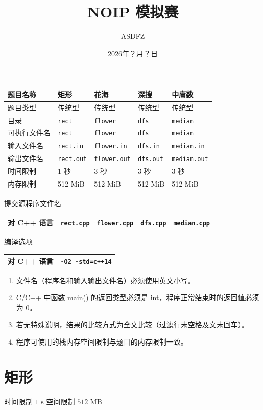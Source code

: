 \documentclass[12pt,a4paper,oneside]{ctexart}
\begin{document}
\title{\heiti{} NOIP 模拟赛}\author{ASDFZ}\date{2026年？月？日}\maketitle
\begin{center}\small
\begin{tabularx}{\textwidth}{|Y|Y|Y|Y|Y|}\hline
题目名称 & 矩形 & 花海 & 深搜 & 中庸数\\\hline
题目类型 & 传统型 & 传统型 & 传统型 & 传统型\\\hline
目录 & \texttt{rect} & \texttt{flower} & \texttt{dfs} & \texttt{median}\\\hline
可执行文件名 & \texttt{rect} & \texttt{flower} & \texttt{dfs} & \texttt{median}\\\hline
输入文件名 & \texttt{rect.in} & \texttt{flower.in} & \texttt{dfs.in} & \texttt{median.in}\\\hline
输出文件名 & \texttt{rect.out} & \texttt{flower.out} & \texttt{dfs.out} & \texttt{median.out}\\\hline
时间限制 & 1 秒 & 3 秒 & 3 秒 & 3 秒\\\hline
内存限制 & 512 MiB & 512 MiB & 512 MiB & 512 MiB\\\hline
\end{tabularx}\end{center}
\hspace{2em}提交源程序文件名
\begin{center}\small\begin{tabularx}{\textwidth}{|p{100pt}|Y|Y|Y|Y|}\hline
对 C++ 语言 & \texttt{rect.cpp} & \texttt{flower.cpp} & \texttt{dfs.cpp} & \texttt{median.cpp}\\\hline
\end{tabularx}\end{center}
\hspace{2em}编译选项
\begin{center}\small\begin{tabularx}{\textwidth}{|p{100pt}|Y|}\hline
对 C++ 语言 & \texttt{-O2 -std=c++14}\\\hline
\end{tabularx}\end{center}
\vspace{.8em}\hspace{1em}{\heiti 注意事项与提醒：}
\begin{enumerate}[topsep=4pt,itemsep=2pt,parsep=2pt]
\item 文件名（程序名和输入输出文件名）必须使用英文小写。
\item C/C++ 中函数 main() 的返回类型必须是 int，程序正常结束时的返回值必须为 0。
\item 若无特殊说明，结果的比较方式为全文比较（过滤行末空格及文末回车）。
\item 程序可使用的栈内存空间限制与题目的内存限制一致。
\end{enumerate}
\thispagestyle{empty}\newpage
\newpage\section{矩形}
时间限制 $\text{1 s}$
空间限制 $\text{512 MB}$
\end{document}
